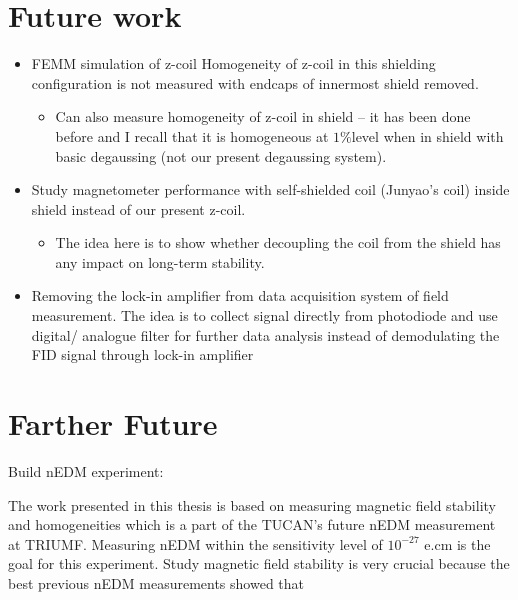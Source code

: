 \section{Future work}
\begin{itemize}
\item	FEMM simulation of z-coil 	Homogeneity of z-coil in this shielding configuration is not  measured with endcaps of innermost shield removed.
\begin{itemize}

\item
Can also measure homogeneity of z-coil in shield – it has been done before and I recall that it is homogeneous at $1\% $level when in shield with basic degaussing (not our present degaussing system).
\end{itemize}
\item
Study magnetometer performance with self-shielded coil (Junyao's coil) inside shield instead of our present z-coil. 
\begin{itemize}
\item	The idea here is to show whether decoupling the coil from the shield has any impact on long-term stability.
\end{itemize}
 \item Removing the lock-in amplifier from data  acquisition system of field measurement. The idea is to collect signal directly from photodiode and use digital/ analogue filter for further data analysis  instead of demodulating the FID signal through lock-in amplifier 

\end{itemize}

\section{Farther Future}
Build nEDM experiment:

The work presented in this thesis is based on measuring magnetic field stability and homogeneities which is a part of the TUCAN's future nEDM measurement at TRIUMF. Measuring nEDM within the sensitivity level of $10^{-27}$ e.cm is the goal for this experiment. Study magnetic field stability is very crucial because the best previous nEDM measurements showed that 





